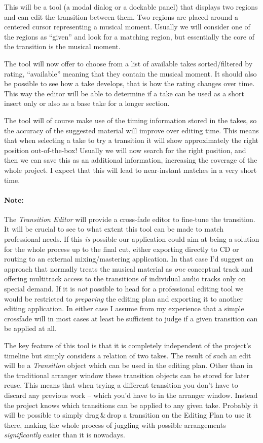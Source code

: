 \documentclass[11pt,a4paper]{article}
\begin{document}
This will be a tool (a modal dialog or a dockable panel) that displays two
regions and can edit the transition between them.
Two regions are placed around a centered cursor representing a musical moment.
Usually we will consider one of the regions as “given” and look for a matching
region, but essentially the core of the transition is the musical moment.

The tool will now offer to choose from a list of available takes sorted/filtered
by rating, “available” meaning that they contain the musical moment.
It should also be possible to see how a take develops, that is how the rating
changes over time.
This way the editor will be able to determine if a take can be used as a short
insert only or also as a base take for a longer section.

The tool will of course make use of the timing information stored in the takes,
so the accuracy of the suggested material will improve over editing time.
This means that when selecting a take to try a transition it will show
approximately the right position out-of-the-box!
Usually we will now search for the right position, and then we can save this as
an additional information, increasing the coverage of the whole project.
I expect that this will lead to near-instant matches in a very short time.

\paragraph{Note:}
The \emph{Transition Editor} will provide a cross-fade editor to fine-tune the
transition.
It will be crucial to see to what extent this tool can be made to match
professional needs.
If this \emph{is} possible our application could aim at being a solution for the
whole process up to the final cut, either exporting directly to CD or routing to
an external mixing/mastering application.
In that case I'd suggest an approach that normally treats the musical material
as \emph{one} conceptual track and offering multitrack access to the transitions
of individual audio tracks only on special demand.
If it is \emph{not} possible to head for a professional editing tool we would be
restricted to \emph{preparing} the editing plan and exporting it to another
editing application.
In either case I assume from my experience that a simple crossfade will in most
cases at least be sufficient to judge if a given transition can be applied at
all.

\medskip
The key feature of this tool is that it is completely independent of the
project's timeline but simply considers a relation of two takes.
The result of such an edit will be a \emph{Transition} object which can be used
in the editing plan.
Other than in the traditional arranger window these transition objects can be
stored for later reuse.
This means that when trying a different transition you don't have to discard any
previous work -- which you'd have to in the arranger window.
Instead the project knows which transitions can be applied to any given take.
Probably it will be possible to simply drag\,\&\,drop a transition on the
Editing Plan to use it there, making the whole process of juggling with possible
arrangements \emph{significantly} easier than it is nowadays.
\end{document}
